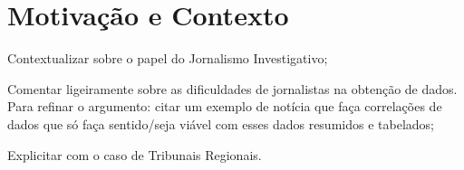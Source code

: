 \section{Motivação e Contexto}

\begin{todolist}
    \item Contextualizar sobre o papel do Jornalismo Investigativo;
    \item Comentar ligeiramente sobre as dificuldades de jornalistas na
          obtenção de dados. Para refinar o argumento: citar um exemplo de
          notícia que faça correlações de dados que só faça sentido/seja viável
          com esses dados resumidos e tabelados;
    \item Explicitar com o caso de Tribunais Regionais.
\end{todolist}

